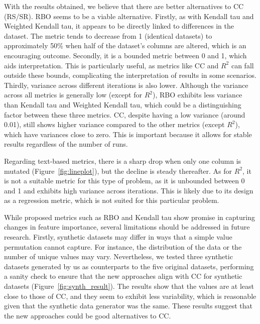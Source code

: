 

With the results obtained, we believe that there are better alternatives to CC (RS/SR). RBO seems to be a viable alternative. Firstly, as with Kendall tau and Weighted Kendall tau, it appears to be directly linked to differences in the dataset. The metric tends to decrease from 1 (identical datasets) to approximately 50\% when half of the dataset's columns are altered, which is an encouraging outcome. Secondly, it is a bounded metric between 0 and 1, which aids interpretation. This is particularly useful, as metrics like CC and $R^2$ can fall outside these bounds, complicating the interpretation of results in some scenarios. Thirdly, variance across different iterations is also lower. Although the variance across all metrics is generally low (except for $R^2$), RBO exhibits less variance than Kendall tau and Weighted Kendall tau, which could be a distinguishing factor between these three metrics. CC, despite having a low variance (around 0.01), still shows higher variance compared to the other metrics (except $R^2$), which have variances close to zero. This is important because it allows for stable results regardless of the number of runs.

Regarding text-based metrics, there is a sharp drop when only one column is mutated (Figure~\ref{fig:lineplot}), but the decline is steady thereafter. As for $R^2$, it is not a suitable metric for this type of problem, as it is unbounded between 0 and 1 and exhibits high variance across iterations. This is likely due to its design as a regression metric, which is not suited for this particular problem.

While proposed metrics such as RBO and Kendall tau show promise in capturing changes in feature importance, several limitations should be addressed in future research. Firstly, synthetic datasets may differ in ways that a simple value permutation cannot capture. For instance, the distribution of the data or the number of unique values may vary. Nevertheless, we tested three synthetic datasets generated by us as counterparts to the five original datasets, performing a sanity check to ensure that the new approaches align with CC for synthetic datasets (Figure~\ref{fig:synth_result}). The results show that the values are at least close to those of CC, and they seem to exhibit less variability, which is reasonable given that the synthetic data generator was the same. These results suggest that the new approaches could be good alternatives to CC.

